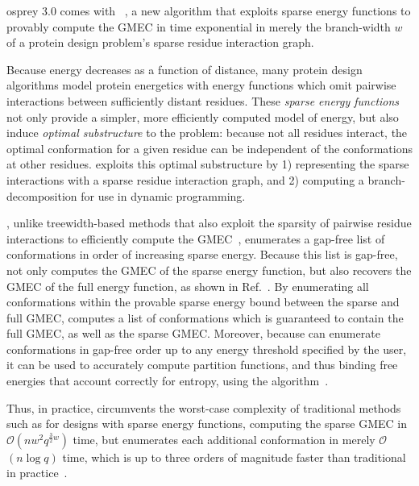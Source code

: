 \def\Oh{$\mathcal{O}$}

{\sc osprey} 3.0 comes with {\bwmstar}~\cite{BWM*}, a new algorithm that exploits sparse energy functions to provably compute the GMEC in time exponential in merely the branch-width $w$ of a protein design problem's sparse residue interaction graph.

Because energy decreases as a function of distance, many protein design algorithms model protein energetics with energy functions which omit pairwise interactions between sufficiently distant residues. These \emph{sparse energy functions} not only provide a simpler, more efficiently computed model of energy, but also induce \emph{optimal substructure} to the problem: because not all residues interact, the optimal conformation for a given residue can be independent of the conformations at other residues. {\bwmstar} exploits this optimal substructure by 1) representing the sparse interactions with a sparse residue interaction graph, and 2) computing a branch-decomposition for use in dynamic programming. 

{\bwmstar}, unlike treewidth-based methods that also exploit the sparsity of pairwise residue interactions to efficiently compute the GMEC~\cite{treewidth}, enumerates a gap-free list of conformations in order of increasing sparse energy. Because this list is gap-free, {\bwmstar} not only computes the GMEC of the sparse energy function, but also recovers the GMEC of the full energy function, as shown in Ref.~. By enumerating all conformations within the provable sparse energy bound between the sparse and full GMEC, {\bwmstar} computes a list of conformations which is guaranteed to contain the full GMEC, as well as the sparse GMEC.  Moreover, because {\bwmstar} can enumerate conformations in gap-free order up to any energy threshold specified by the user, it can be used to accurately compute partition functions, and thus binding free energies that account correctly for entropy, using the \ks algorithm~\cite{K*,minDEE}.  

Thus, in practice, {\bwmstar} circumvents the worst-case complexity of traditional methods such as \as for designs with sparse energy functions, computing the sparse GMEC in \Oh$(nw^2q^{\frac{3}{2}w})$ time, but enumerates each additional conformation in merely \Oh$(n\log q)$ time, which is up to three orders of magnitude faster than traditional \as in practice~\cite{BWM*}.
